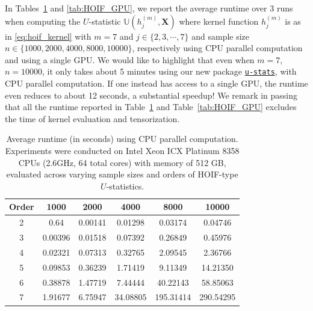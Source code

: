 \documentclass[twoside,11pt]{article}
\newcommand{\libref}[2]{\href{#2}{\texttt{#1}}}
\newcommand{\ustat}{\mathbb{U}}
\newcommand{\ustatp}[2]{\ustat(#1,#2)}
\def\package{\libref{u-stats}{https://github.com/zrq1706/U-Statistics-python}}
\begin{document}
In Tables~\ref{tab:HOIF_CPU} and \ref{tab:HOIF_GPU}, we report the average runtime over 3 runs when computing the $U$-statistic $\ustatp{h_j^{(m)}}{\bm{X}}$ where kernel function $h_j^{(m)}$ is as in \eqref{eq:hoif_kernel} with $m=7$ and $j \in \{2, 3, \cdots, 7\}$ and sample size $n \in \{1000, 2000, 4000, 8000, 10000\}$, respectively using CPU parallel computation and using a single GPU. We would like to highlight that even when $m = 7$, $n = 10000$, it only takes about 5 minutes using our new package \package{}, with CPU parallel computation. If one instead has access to a single GPU, the runtime even reduces to about 12 seconds, a substantial speedup! We remark in passing that all the runtime reported in Table~\ref{tab:HOIF_CPU} and Table~\ref{tab:HOIF_GPU} excludes the time of kernel evaluation and tensorization.


\begin{table}[ht]
\centering
\caption{Average runtime (in seconds) using CPU parallel computation. Experiments were conducted on Intel Xeon ICX Platinum 8358 CPUs (2.6GHz, 64 total cores) with memory of 512 GB, evaluated across varying sample sizes and orders of HOIF-type $U$-statistics.}
\label{tab:HOIF_CPU}
\begin{tabular}{cccccc}
\toprule
\textbf{Order} & \textbf{1000} & \textbf{2000} & \textbf{4000} & \textbf{8000} & \textbf{10000} \\       
\midrule
2 & 0.64 & 0.00141 & 0.01298 & 0.03174 & 0.04746 \\
3 & 0.00396 & 0.01518 & 0.07392 & 0.26849 & 0.45976 \\
4 & 0.02321 & 0.07313 & 0.32765 & 2.09545 & 2.36766 \\
5 & 0.09853 & 0.36239 & 1.71419 & 9.11349 & 14.21350 \\
6 & 0.38878 & 1.47719 & 7.44444 & 40.22143 & 58.85063 \\
7 & 1.91677 & 6.75947 & 34.08805 & 195.31414 & 290.54295 \\
\bottomrule
\end{tabular}
\end{table}
\end{document}
